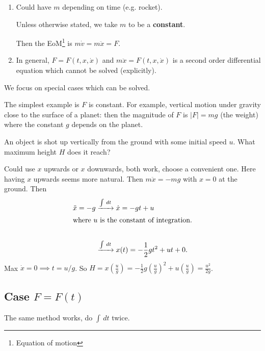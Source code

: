 \documentclass[10pt, a4paper]{article}
\begin{document}
\begin{remark}\phantom{}
    \begin{enumerate}[label = (\roman*)]
        \item Could have $m$ depending on time
        (e.g. rocket).

        Unless otherwise stated,
        we take $m$ to be a \textbf{constant}.

        Then the EoM\footnote{Equation of motion} is $m\dot{v} = m\ddot{x} = F$.

        \item In general,
        $F = F(t, x, \dot{x})$ and $m\ddot{x} = F(t, x, \dot{x})$ is a second order differential equation which cannot be solved
        (explicitly).
    \end{enumerate}
\end{remark}

We focus on special cases which can be solved.

The simplest example is $F$ is constant.
For example,
vertical motion under gravity close to the surface of a planet:
then the magnitude of $F$ is $|F| = mg$
(the weight)
where the constant $g$ depends on the planet.

\begin{example}
    An object is shot up vertically from the ground with some initial speed $u$.
    What maximum height $H$ does it reach?
    \begin{solution}
        Could use $x$ upwards or $x$ downwards,
        both work,
        choose a convenient one.
        Here having $x$ upwards seems more natural.
        Then $m\ddot{x} = -mg$ with $x = 0$ at the ground.
        Then
        \begin{align*}
            \ddot{x} = -g &\xrightarrow{\int\,dt} \dot{x} = -gt + u \\
            \intertext{where $u$ is the constant of integration.} \\
            &\xrightarrow{\int\,dt} x(t) = -\frac{1}{2}gt ^ 2 + ut + 0.
        \end{align*}
        Max $\dot{x} = 0 \implies t = u / g$.
        So $H = x\left(\frac{u}{g}\right) = -\frac{1}{2}g\left(\frac{u}{g}\right) ^ 2 + u\left(\frac{u}{g}\right) = \frac{u ^ 2}{2g}$.
    \end{solution}
\end{example}

\subsection{Case \texorpdfstring{$F = F(t)$}{}}
The same method works,
do $\int\,dt$ twice.
\end{document}
